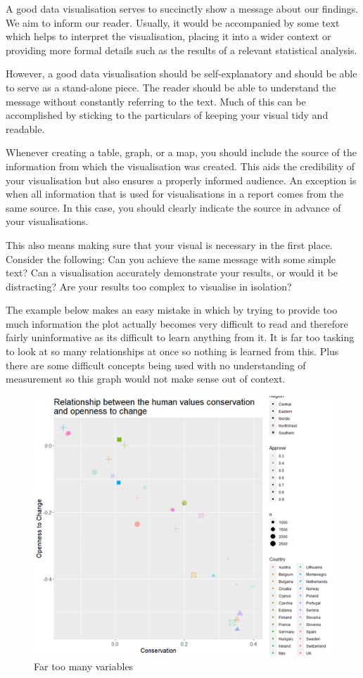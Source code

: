 \documentclass[
  titlepage]{book}
\begin{document}
A good data visualisation serves to succinctly show a message about our findings. We aim to inform our reader. Usually, it would be accompanied by some text which helps to interpret the visualisation, placing it into a wider context or providing more formal details such as the results of a relevant statistical analysis.

However, a good data visualisation should be self-explanatory and should be able to serve as a stand-alone piece. The reader should be able to understand the message without constantly referring to the text. Much of this can be accomplished by sticking to the particulars of keeping your visual tidy and readable.

Whenever creating a table, graph, or a map, you should include the source of the information from which the visualisation was created. This aids the credibility of your visualisation but also ensures a properly informed audience. An exception is when all information that is used for visualisations in a report comes from the same source. In this case, you should clearly indicate the source in advance of your visualisations.

This also means making sure that your visual is necessary in the first place. Consider the following: Can you achieve the same message with some simple text? Can a visualisation accurately demonstrate your results, or would it be distracting? Are your results too complex to visualise in isolation?

The example below makes an easy mistake in which by trying to provide too much information the plot actually becomes very difficult to read and therefore fairly uninformative as its difficult to learn anything from it. It is far too tasking to look at so many relationships at once so nothing is learned from this. Plus there are some difficult concepts being used with no understanding of measurement so this graph would not make sense out of context.

\begin{figure}
\centering
\includegraphics{img/Too many variables.png}
\caption{Far too many variables}
\end{figure}
\end{document}
